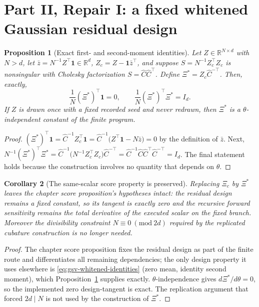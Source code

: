 \documentclass[11pt]{article}
\newtheorem{proposition}{Proposition}[section]
\newtheorem{corollary}[proposition]{Corollary}
\theoremstyle{definition}
\theoremstyle{remark}
\begin{document}
\section{Part II, Repair I: a fixed whitened Gaussian residual design}
\label{sec:gsv-design}

\begin{proposition}[Exact first- and second-moment identities]
\label{prop:gsv-whitened-design-identities}
Let $Z\in\mathbb{R}^{N\times d}$ with $N>d$, let
$\bar z=N^{-1}Z^{\top}\mathbf 1\in\mathbb{R}^{d}$,
$Z_c=Z-\mathbf 1\bar z^{\top}$, and suppose
$S=N^{-1}Z_c^{\top}Z_c$ is nonsingular with Cholesky factorization
$S=\widehat C\widehat C^{\top}$.  Define
$\Xi^{*}=Z_c\widehat C^{-\top}$.  Then, exactly,
\begin{equation}
\label{eq:gsv-whitened-identities}
 \frac1N(\Xi^{*})^{\top}\mathbf 1=0,
 \qquad
 \frac1N(\Xi^{*})^{\top}\Xi^{*}=I_d .
\end{equation}
If $Z$ is drawn once with a fixed recorded seed and never redrawn, then
$\Xi^{*}$ is a $\theta$-independent constant of the finite program.
\end{proposition}

\begin{proof}
$(\Xi^{*})^{\top}\mathbf 1
=\widehat C^{-1}Z_c^{\top}\mathbf 1
=\widehat C^{-1}\big(Z^{\top}\mathbf 1-N\bar z\big)=0$ by the definition of
$\bar z$.  Next,
$N^{-1}(\Xi^{*})^{\top}\Xi^{*}
=\widehat C^{-1}\big(N^{-1}Z_c^{\top}Z_c\big)\widehat C^{-\top}
=\widehat C^{-1}\widehat C\widehat C^{\top}\widehat C^{-\top}=I_d$.
The final statement holds because the construction involves no quantity that
depends on $\theta$.
\end{proof}

\begin{corollary}[The same-scalar score property is preserved]
\label{cor:gsv-design-tangent}
Replacing $\Xi_c$ by $\Xi^{*}$ leaves the chapter score proposition's
hypotheses intact: the residual design remains a fixed constant, so its
tangent is exactly zero and the recursive forward sensitivity remains the
total derivative of the executed scalar on the fixed branch.  Moreover the
divisibility constraint $N\equiv0\ (\mathrm{mod}\ 2d)$ required by the
replicated cubature construction is no longer needed.
\end{corollary}

\begin{proof}
The chapter score proposition fixes the residual design as part of the finite
route and differentiates all remaining dependencies; the only design property
it uses elsewhere is \eqref{eq:gsv-whitened-identities} (zero mean, identity
second moment), which Proposition~\ref{prop:gsv-whitened-design-identities}
supplies exactly.  $\theta$-independence gives $d\Xi^{*}/d\theta=0$, so the
implemented zero design-tangent is exact.  The replication argument that
forced $2d\mid N$ is not used by the construction of $\Xi^{*}$.
\end{proof}
\end{document}
